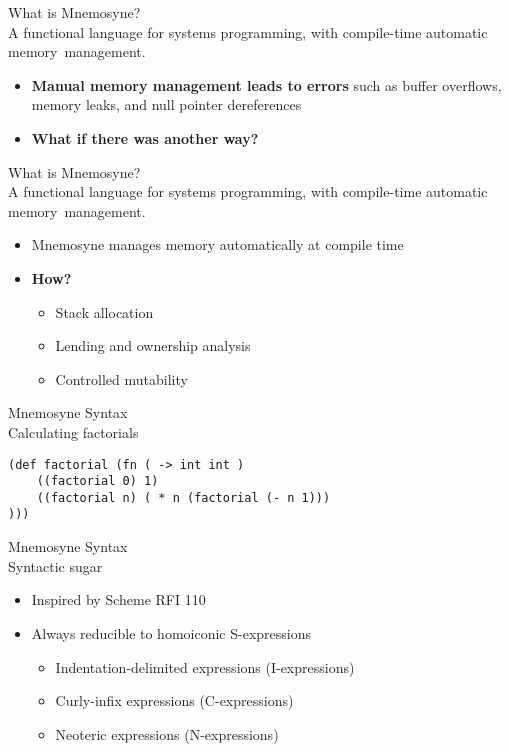 \documentclass{beamer}
\begin{document}
\begin{frame}
\alert{\huge{What is Mnemosyne?}}\\
\large{A functional language for systems programming, \alert{with compile-time automatic memory~management}.}\normalsize
\begin{itemize}
    \item \textbf{Manual memory management leads to errors} such as buffer overflows, memory leaks, and null pointer dereferences~\cite{Shapiro:2006:PLC:1215995.1216004,hawblitzel2004low}
    \item \textbf{What if there was another way?}
\end{itemize}
\end{frame}

\begin{frame}
\alert{\huge{What is Mnemosyne?}}\\
\large{A functional language for systems programming, \alert{with compile-time automatic memory~management}.}\normalsize
\begin{itemize}
    \item Mnemosyne manages memory automatically at compile time
    \item \textbf{How?}
    \begin{itemize}
    \item<2-> Stack allocation~\cite{Hanson:1990:ESA:91556.91603,Corry:2006:OSA:1133956.1133978,Matsakis:2014:RL:2663171.2663188}
    \item<2-> Lending and ownership analysis~\cite{Matsakis:2014:RL:2663171.2663188}
    \item<2-> Controlled mutability~\cite{Matsakis:2014:RL:2663171.2663188}
\end{itemize}
\end{itemize}
\end{frame}

\begin{frame}[fragile]
\alert{\huge{Mnemosyne Syntax}}\\
\large{Calculating factorials}\normalsize
\begin{verbatim}
(def factorial (fn ( -> int int )
    ((factorial 0) 1)
    ((factorial n) ( * n (factorial (- n 1)))
)))
\end{verbatim}
\end{frame}

\begin{frame}
\alert{\huge{Mnemosyne Syntax}}\\
\large{Syntactic sugar}\normalsize
\begin{itemize}
    \item Inspired by Scheme RFI 110~\cite{wheeler2006sweet}
    \item Always reducible to homoiconic S-expressions
    \begin{itemize}
        \item Indentation-delimited expressions (I-expressions)
        \item Curly-infix expressions (C-expressions)
        \item Neoteric expressions (N-expressions)
    \end{itemize}
\end{itemize}
\end{frame}
\end{document}
